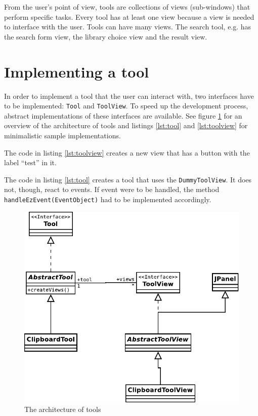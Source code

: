\documentclass[12pt]{book}
\newcommand{\lllhome}{../../../examples/src/main/java/de/unidue/inf/is/ezdl/examples/}
\begin{document}
From the user's point of view, tools are collections of views (sub-windows) that perform specific tasks. Every tool has at least one view because a view is needed to interface with the user. Tools can have many views. The search tool, e.g. has the search form view, the library choice view and the result view.


\section{Implementing a tool}

In order to implement a tool that the user can interact with, two interfaces have to be implemented: {\tt Tool} and {\tt ToolView}. To speed up the development process, abstract implementations of these interfaces are available. See figure \ref{fig:toolarchitecture} for an overview of the architecture of tools and listings \ref{lst:tool} and \ref{lst:toolview} for minimalistic sample implementations.

The code in listing \ref{lst:toolview} creates a new view that has a button with the label ``test'' in it. 

The code in listing \ref{lst:tool} creates a tool that uses the {\tt DummyToolView}. It does not, though, react to events. If event were to be handled, the method {\tt handleEzEvent(EventObject)} had to be implemented accordingly.








\begin{figure}[t]
\begin{center}
  \includegraphics[width=.75\linewidth]{Tool}
  \caption{The architecture of tools}
  \label{fig:toolarchitecture}
\end{center}
\end{figure}
\end{document}
